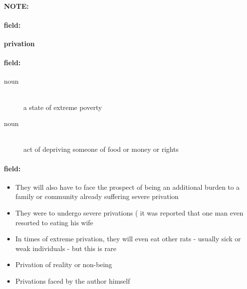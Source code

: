 \documentclass[12pt]{article}
\newenvironment{note}{\paragraph{NOTE:}}{}
\newenvironment{field}{\paragraph{field:}}{}
\begin{document}
\begin{note}
\begin{field}
\textbf{\large privation}
\end{field}


\begin{field}
\begin{description}
\item[noun] \hfill \\ 
a state of extreme poverty

\item[noun] \hfill \\ 
act of depriving someone of food or money or rights

\end{description}
\end{field}

\begin{field}
\begin{itemize}
\item They will also have to face the prospect of being an additional burden to a family or community already suffering severe privation
\item They were to undergo severe privations ( it was reported that one man even resorted to eating his wife
\item In times of extreme privation, they will even eat other rats - usually sick or weak individuals - but this is rare
\item Privation of reality or non-being
\item Privations faced by the author himself
\end{itemize}
\end{field}
\end{note}
\end{document}

